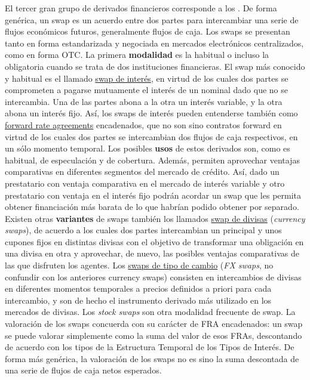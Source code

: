 \documentclass{nuevotema}
\begin{document}
El tercer gran grupo de derivados financieros corresponde a los . De forma genérica, un swap es un acuerdo entre dos partes para intercambiar una serie de flujos económicos futuros, generalmente flujos de caja. Los swaps se presentan tanto en forma estandarizada y negociada en mercados electrónicos centralizados, como en forma OTC. La primera \textbf{modalidad} es la habitual o incluso la obligatoria cuando se trata de dos instituciones financieras. El swap más conocido y habitual es el llamado \underline{swap de interés}, en virtud de los cuales dos partes se comprometen a pagarse mutuamente el interés de un nominal dado que no se intercambia. Una de las partes abona a la otra un interés variable, y la otra abona un interés fijo. Así, los swaps de interés pueden entenderse también como \underline{forward rate agreements} encadenados, que no son sino contratos forward en virtud de los cuales dos partes se intercambian dos flujos de caja respectivos, en un sólo momento temporal. Los posibles \textbf{usos} de estos derivados son, como es habitual, de especulación y de cobertura. Además, permiten aprovechar ventajas comparativas en diferentes segmentos del mercado de crédito. Así, dado un prestatario con ventaja comparativa en el mercado de interés variable y otro prestatario con ventaja en el interés fijo podrán acordar un swap que les permita obtener financiación más barata de lo que habrían podido obtener por separado. Existen otras \textbf{variantes} de swaps también los llamados \underline{swap de divisas} (\textit{currency swaps}), de acuerdo a los cuales dos partes intercambian un principal y unos cupones fijos en distintas divisas con el objetivo de transformar una obligación en una divisa en otra y aprovechar, de nuevo, las posibles ventajas comparativas de las que disfruten los agentes. Los \underline{swaps de tipo de cambio} (\textit{FX swaps}, no confundir con los anteriores currency swaps) consisten en intercambios de divisas en diferentes momentos temporales a precios definidos a priori para cada intercambio, y son de hecho el instrumento derivado más utilizado en los mercados de divisas. Los \textit{stock swaps} son otra modalidad frecuente de swap. La valoración de los swaps concuerda con su carácter de FRA encadenados: un swap se puede valorar simplemente como la suma del valor de esos FRAs, descontando de acuerdo con los tipos de la Estructura Temporal de los Tipos de Interés. De forma más genérica, la valoración de los swaps no es sino la suma descontada de una serie de flujos de caja netos esperados.
\end{document}
